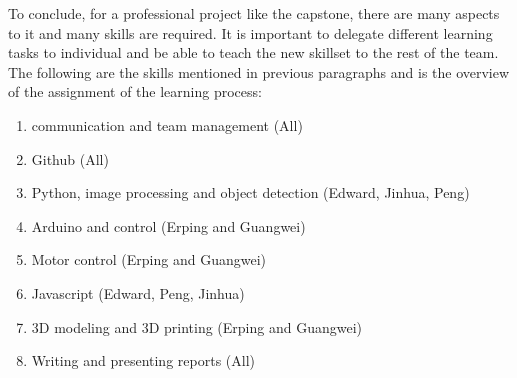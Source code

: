 \documentclass[12pt]{article}
\begin{document}
To conclude, for a professional project like the capstone, there are many aspects to it and many skills are required. It is important to delegate different learning tasks to individual and be able to teach the new skillset to the rest of the team. The following are the skills mentioned in previous paragraphs and is the overview of the assignment of the learning process:


\begin{enumerate}
  \item communication and team management (All)
  \item Github (All)
  \item Python, image processing and object detection (Edward, Jinhua, Peng)
  \item Arduino and control (Erping and Guangwei)
  \item Motor control (Erping and Guangwei)
  \item Javascript (Edward, Peng, Jinhua)
  \item 3D modeling and 3D printing (Erping and Guangwei)
  \item Writing and presenting reports (All)
\end{enumerate}
\end{document}
